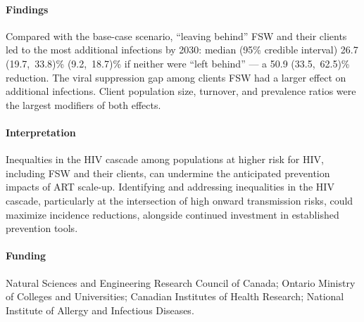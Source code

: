 \paragraph{Findings}
Compared with the base-case scenario, ``leaving behind'' FSW and their clients
led to the most additional infections by 2030: median (95\% credible interval)
26.7 (19.7,~33.8)\%  (9.2,~18.7)\% if neither were ``left behind''
--- a 50.9 (33.5,~62.5)\% reduction.
The viral suppression gap among clients \vs FSW had a larger effect on additional infections.
Client population size, turnover, and prevalence ratios were the largest modifiers of both effects.
\paragraph{Interpretation}
Inequalties in the HIV cascade among populations at higher risk for HIV, including FSW and their clients,
can undermine the anticipated prevention impacts of ART scale-up.
Identifying and addressing inequalities in the HIV cascade,
particularly at the intersection of high onward transmission risks,
could maximize incidence reductions,
alongside continued investment in established prevention tools.
\paragraph{Funding}
Natural Sciences and Engineering Research Council of Canada;
Ontario Ministry of Colleges and Universities;
Canadian Institutes of Health Research;
National Institute of Allergy and Infectious Diseases.
